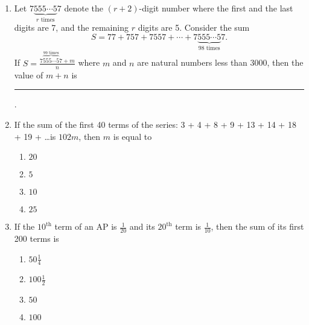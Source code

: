\begin{enumerate}    [label=\thesubsection.\arabic*, ref=\thesubsection.\theenumi]
	\hfill {}
\item  Let $ {7\underbrace{555\cdots5}_{r \text{ times}}7} $ denote the \( (r+2) \)-digit number where the first and the last digits are 7, and the remaining \( r \) digits are 5. Consider the sum $$S =77 + 757 + 7557 + \cdots + 7\underbrace{555\cdots5}_{98 \text{ times}}7.$$ If $ S = \frac{7\overbrace{555\cdots5}^{99 \text{ times}}7+m}{n} $ where \( m \) and \( n \) are natural numbers less than 3000, then the value of \( m + n \) is \rule{1cm}{0.1pt}.
	\hfill {}
\item If the sum of the first 40 terms of the series: 3 + 4 + 8 + 9 + 13 + 14 + 18 + 19 + \dots is $102m$, then $m$ is equal to
	\hfill {}
		\begin{multicols}{4}
\begin{enumerate}
   \item $20$
   \item $5$
   \item $10$
   \item $25$
\end{enumerate}
                                         \end{multicols} 
					 \item If the $10^{\text{th}}$ term of an  AP  is $\frac{1}{20}$ and its $20^{\text{th}}$ term is $\frac{1}{10}$, then the sum of its first 200 terms is
	\hfill {}
		\begin{multicols}{4}
\begin{enumerate}
    \item $50 \frac{1}{4}$
    \item $100 \frac{1}{2}$
    \item $50$
    \item $100$
\end{enumerate}
                                         \end{multicols} 
\end{enumerate}
